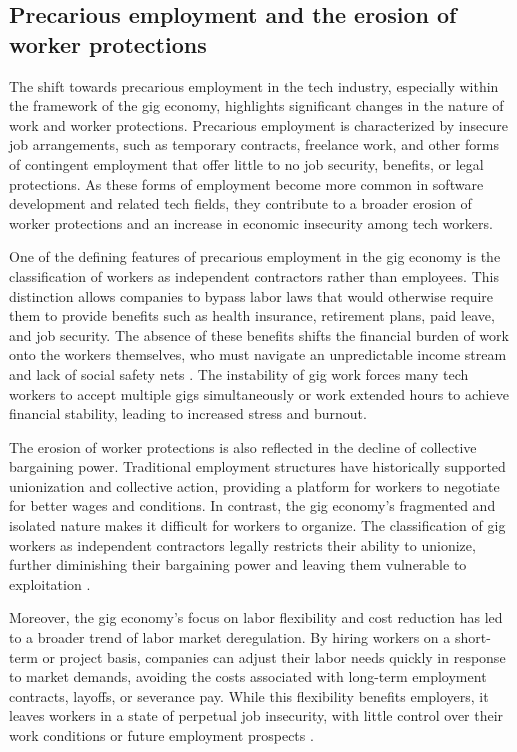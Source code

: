 \subsection{Precarious employment and the erosion of worker protections}

The shift towards precarious employment in the tech industry, especially within the framework of the gig economy, highlights significant changes in the nature of work and worker protections. Precarious employment is characterized by insecure job arrangements, such as temporary contracts, freelance work, and other forms of contingent employment that offer little to no job security, benefits, or legal protections. As these forms of employment become more common in software development and related tech fields, they contribute to a broader erosion of worker protections and an increase in economic insecurity among tech workers.

One of the defining features of precarious employment in the gig economy is the classification of workers as independent contractors rather than employees. This distinction allows companies to bypass labor laws that would otherwise require them to provide benefits such as health insurance, retirement plans, paid leave, and job security. The absence of these benefits shifts the financial burden of work onto the workers themselves, who must navigate an unpredictable income stream and lack of social safety nets \cite[pp.~1-3]{kalleberg2011precarious}. The instability of gig work forces many tech workers to accept multiple gigs simultaneously or work extended hours to achieve financial stability, leading to increased stress and burnout.

The erosion of worker protections is also reflected in the decline of collective bargaining power. Traditional employment structures have historically supported unionization and collective action, providing a platform for workers to negotiate for better wages and conditions. In contrast, the gig economy's fragmented and isolated nature makes it difficult for workers to organize. The classification of gig workers as independent contractors legally restricts their ability to unionize, further diminishing their bargaining power and leaving them vulnerable to exploitation \cite[pp.~119-122]{marsden2017platform}.

Moreover, the gig economy's focus on labor flexibility and cost reduction has led to a broader trend of labor market deregulation. By hiring workers on a short-term or project basis, companies can adjust their labor needs quickly in response to market demands, avoiding the costs associated with long-term employment contracts, layoffs, or severance pay. While this flexibility benefits employers, it leaves workers in a state of perpetual job insecurity, with little control over their work conditions or future employment prospects \cite[pp.~145-148]{fleming2017revolt}.

